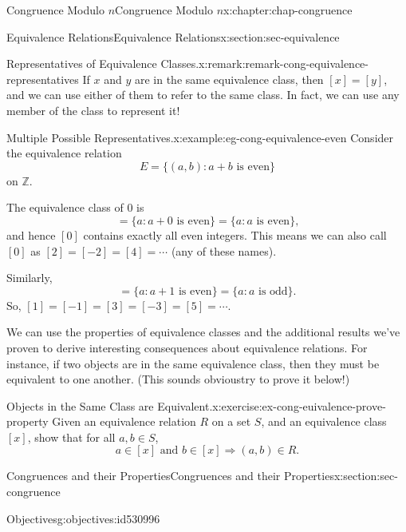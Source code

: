 \documentclass[oneside,10pt,]{book}
\numberwithin{equation}{section}
\begin{document}
\begin{chapterptx}{Congruence Modulo \(n\)}{}{Congruence Modulo \(n\)}{}{}{x:chapter:chap-congruence}
\begin{sectionptx}{Equivalence Relations}{}{Equivalence Relations}{}{}{x:section:sec-equivalence}
\begin{remark}{Representatives of Equivalence Classes.}{x:remark:remark-cong-equivalence-representatives}
If \(x\) and \(y\) are in the same equivalence class, then \([x] = [y]\), and we can use either of them to refer to the same class. In fact, we can use any member of the class to represent it!%
\end{remark}
\begin{example}{Multiple Possible Representatives.}{x:example:eg-cong-equivalence-even}%
Consider the equivalence relation%
\begin{equation*}
E = \{(a,b) : a + b \text{ is even}\}
\end{equation*}
on \(\mathbb{Z}\).%
\par
The equivalence class of \(0\) is%
\begin{equation*}
[0] = \{a : a + 0 \text{ is even}\} = \{a : a \text{ is even}\}\text{,}
\end{equation*}
and hence \([0]\) contains exactly all even integers. This means we can also call \([0]\) as \([2] = [-2] = [4] = \cdots\) (any of these names).%
\par
Similarly,%
\begin{equation*}
[1] = \{a : a + 1 \text{ is even}\} = \{ a : a \text{ is odd}\}\text{.}
\end{equation*}
So, \([1] = [-1] = [3] = [-3] = [5] = \cdots\).%
\end{example}
We can use the properties of equivalence classes and the additional results we've proven to derive interesting consequences about equivalence relations. For instance, if two objects are in the same equivalence class, then they must be equivalent to one another. (This sounds obvious\textemdash{}try to prove it below!)%
\begin{inlineexercise}{Objects in the Same Class are Equivalent.}{x:exercise:ex-cong-euivalence-prove-property}%
Given an equivalence relation \(R\) on a set \(S\), and an equivalence class \([x]\), show that for all \(a, b \in S\),%
\begin{equation*}
a \in [x] \text{ and } b \in [x] \Rightarrow (a,b) \in R\text{.}
\end{equation*}
%
\end{inlineexercise}%
\end{sectionptx}
%
%
\typeout{************************************************}
\typeout{************************************************}
%
\begin{sectionptx}{Congruences and their Properties}{}{Congruences and their Properties}{}{}{x:section:sec-congruence}
\begin{objectives}{Objectives}{g:objectives:id530996}

\end{objectives}
\end{sectionptx}
\end{chapterptx}
\end{document}
